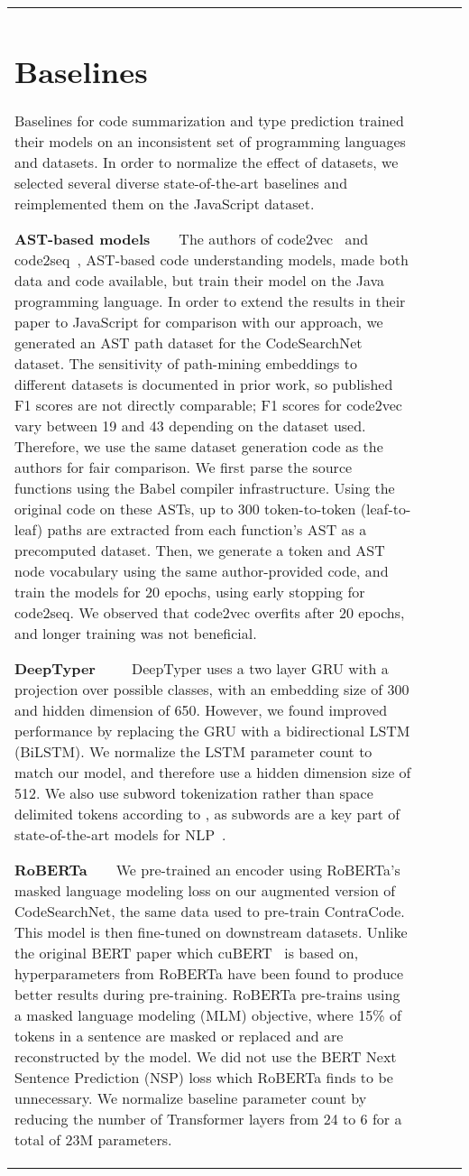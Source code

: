 \documentclass{article}
\newcommand{\ours}[0]{ContraCode}
\begin{document}
\begin{table}[t]
{\begin{tabular}{llcc}
{{\section{Baselines}
\label{sec:appendix:baseline_js}
Baselines for code summarization and type prediction trained their models on an inconsistent set of programming languages and datasets. In order to normalize the effect of datasets, we selected several diverse state-of-the-art baselines and reimplemented them on the JavaScript dataset.

\textbf{AST-based models}~~~~The authors of code2vec~\citep{alon2019code2vec} and code2seq~\citep{alon2018code2seq}, AST-based code understanding models, made both data and code available, but train their model on the Java programming language. In order to extend the results in their paper to JavaScript for comparison with our approach, we generated an AST path dataset for the CodeSearchNet dataset.
The sensitivity of path-mining embeddings to different datasets is documented in prior work, so published F1 scores are not directly comparable; F1 scores for code2vec~\citep{alon2019code2vec} vary between 19 \citep{alon2018code2seq} and 43 \citep{alon2019code2vec} depending on the dataset used. Therefore, we use the same dataset generation code as the authors for fair comparison. We first parse the source functions using the Babel compiler infrastructure. Using the original code on these ASTs, up to 300 token-to-token (leaf-to-leaf) paths are extracted from each function's AST as a precomputed dataset. Then, we generate a token and AST node vocabulary using the same author-provided code, and train the models for 20 epochs, using early stopping for code2seq. We observed that code2vec overfits after 20 epochs, and longer training was not beneficial.

\textbf{DeepTyper}~\citep{hellendoorn2018deep}~~~~DeepTyper uses a two layer GRU with a projection over possible classes, with an embedding size of 300 and hidden dimension of 650. However, we found improved performance by replacing the GRU with a bidirectional LSTM (BiLSTM). We normalize the LSTM parameter count to match our model, and therefore use a hidden dimension size of 512. We also use subword tokenization rather than space delimited tokens according to \citet{kudo2018subword}, as subwords are a key part of state-of-the-art models for NLP~\citep{sennrich2015neural}.

\textbf{RoBERTa}~~~~We pre-trained an encoder using RoBERTa's masked language modeling loss on our augmented version of CodeSearchNet, the same data used to pre-train \ours{}. This model is then fine-tuned on downstream datasets. Unlike the original BERT paper which cuBERT~\citep{cuBERT} is based on, hyperparameters from RoBERTa have been found to produce better results during pre-training. RoBERTa pre-trains using a masked language modeling (MLM) objective, where 15\% of tokens in a sentence are masked or replaced and are reconstructed by the model. We did not use the BERT Next Sentence Prediction (NSP) loss which RoBERTa finds to be unnecessary. We normalize baseline parameter count by reducing the number of Transformer layers from 24 to 6 for a total of 23M parameters.

}}
\end{tabular}}
\end{table}
\end{document}
